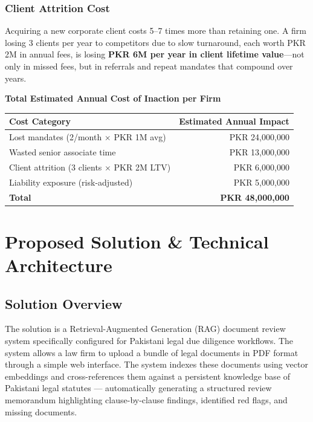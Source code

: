 \documentclass[12pt, a4paper]{article}
\begin{document}
\subsubsection{Client Attrition Cost}

Acquiring a new corporate client costs 5--7 times more than retaining one.
A firm losing 3 clients per year to competitors due to slow turnaround, each worth
PKR 2M in annual fees, is losing \textbf{PKR 6M per year in client lifetime
value}---not only in missed fees, but in referrals and repeat mandates that
compound over years.

\begin{metricbox}
\centering
\vspace{0.2cm}
{\bfseries Total Estimated Annual Cost of Inaction per Firm}\\[0.4cm]
\begin{tabular}{@{}lr@{}}
    \toprule
    \textbf{Cost Category} & \textbf{Estimated Annual Impact} \\
    \midrule
    Lost mandates (2/month $\times$ PKR 1M avg)    & PKR 24,000,000 \\
    Wasted senior associate time                    & PKR 13,000,000 \\
    Client attrition (3 clients $\times$ PKR 2M LTV) & PKR 6,000,000 \\
    Liability exposure (risk-adjusted)             & PKR 5,000,000  \\
    \midrule
    \textbf{Total}                                  & \textbf{PKR 48,000,000} \\
    \bottomrule
\end{tabular}
\vspace{0.1cm}
\end{metricbox}

\section{Proposed Solution \& Technical Architecture}

\subsection{Solution Overview}

The solution is a Retrieval-Augmented Generation (RAG) document review system
specifically configured for Pakistani legal due diligence workflows. The system
allows a law firm to upload a bundle of legal documents in PDF format through a
simple web interface. The system indexes these documents using vector embeddings
and cross-references them against a persistent knowledge base of Pakistani legal
statutes --- automatically generating a structured review memorandum highlighting
clause-by-clause findings, identified red flags, and missing documents.
\end{document}
